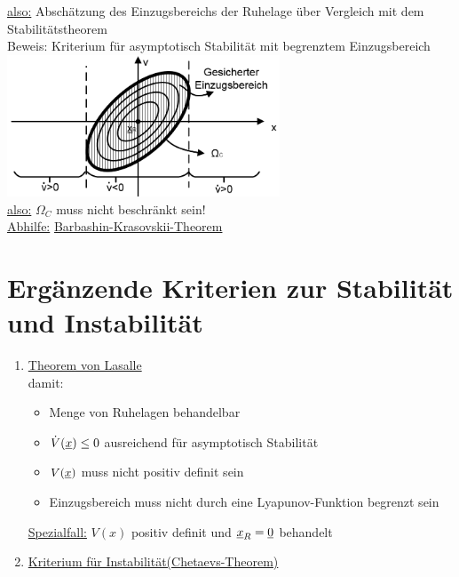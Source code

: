 \documentclass[openany,a4paper,11pt]{book}
\begin{document}
\uline{also:} Abschätzung des Einzugsbereichs der Ruhelage über Vergleich mit dem Stabilitätstheorem\\
Beweis: Kriterium für asymptotisch Stabilität mit begrenztem Einzugsbereich \\
\includegraphics[width=3.2in]{imgs/NLR41.png}\\
\uline{also:} $\Omega_C$ muss nicht beschränkt sein!\\
\uline{Abhilfe:} \uline{Barbashin-Krasovskii-Theorem} 
\section[Ergänzende Kriterien]{Ergänzende Kriterien zur Stabilität und Instabilität}
\begin{enumerate}
    \item \uline{Theorem von Lasalle} \\
    damit:  {\begin{itemize}
        \item Menge von Ruhelagen behandelbar
        \item $\dot{V}(\uline{x})\le 0$ ausreichend für asymptotisch Stabilität
        \item $V(\uline{x})$ muss nicht positiv definit sein
        \item Einzugsbereich muss nicht durch eine Lyapunov-Funktion begrenzt sein
    \end{itemize}}
    \uline{Spezialfall:} $V(x)$ positiv definit und $\uline{x}_R=\uline{0}$ behandelt 
    \item \uline{Kriterium für Instabilität(Chetaevs-Theorem)}   
\end{enumerate}
\end{document}
